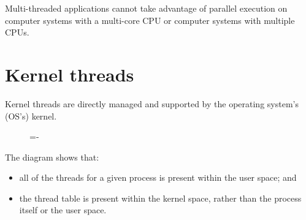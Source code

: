 \documentclass[a4paper]{systems-software}
\begin{document}
Multi-threaded applications cannot take advantage of parallel execution on computer systems with a multi-core CPU or computer systems with multiple CPUs.


\newpage

\section*{Kernel threads}

Kernel threads are directly managed and supported by the operating system’s (OS’s) kernel.

\begin{figure}[H]
  \lineskip=-\fboxrule
\end{figure}

The diagram shows that:
\begin{itemize}
	\item all of the threads for a given process is present within the user space; and
	\item the thread table is present within the kernel space, rather than the process itself or the user space.
\end{itemize}
\end{document}
